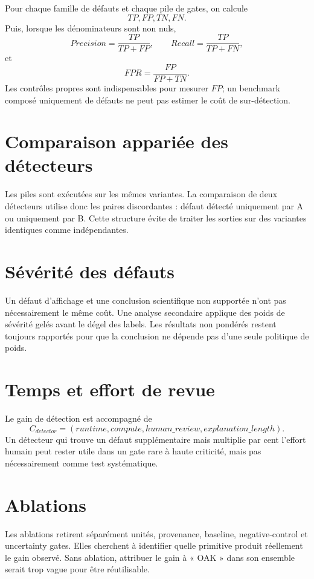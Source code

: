 Pour chaque famille de défauts et chaque pile de gates, on calcule
\[
TP,FP,TN,FN.
\]
Puis, lorsque les dénominateurs sont non nuls,
\[
Precision=\frac{TP}{TP+FP},\qquad
Recall=\frac{TP}{TP+FN},
\]
et
\[
FPR=\frac{FP}{FP+TN}.
\]
Les contrôles propres sont indispensables pour mesurer $FP$; un benchmark composé uniquement de défauts ne peut pas estimer le coût de sur-détection.

\section{Comparaison appariée des détecteurs}

Les piles sont exécutées sur les mêmes variantes. La comparaison de deux détecteurs utilise donc les paires discordantes : défaut détecté uniquement par A ou uniquement par B. Cette structure évite de traiter les sorties sur des variantes identiques comme indépendantes.

\section{Sévérité des défauts}

Un défaut d'affichage et une conclusion scientifique non supportée n'ont pas nécessairement le même coût. Une analyse secondaire applique des poids de sévérité gelés avant le dégel des labels. Les résultats non pondérés restent toujours rapportés pour que la conclusion ne dépende pas d'une seule politique de poids.

\section{Temps et effort de revue}

Le gain de détection est accompagné de
\[
C_{detector}=(runtime,compute,human\_review,explanation\_length).
\]
Un détecteur qui trouve un défaut supplémentaire mais multiplie par cent l'effort humain peut rester utile dans un gate rare à haute criticité, mais pas nécessairement comme test systématique.

\section{Ablations}

Les ablations retirent séparément unités, provenance, baseline, negative-control et uncertainty gates. Elles cherchent à identifier quelle primitive produit réellement le gain observé. Sans ablation, attribuer le gain à « OAK » dans son ensemble serait trop vague pour être réutilisable.

